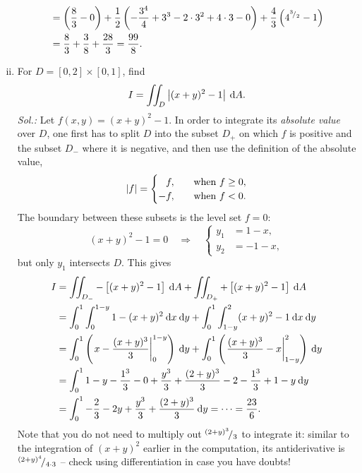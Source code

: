 \begin{example}
\begin{enumerate}[(i)]
\begin{equation*}
\begin{split}
& = \left(\frac83-0\right) + \frac12\left( -\frac{3^4}{4}+3^3-2 \cdot 3^2+4 \cdot 3- 0\right) 
    +\frac43\left( 4^{{}^{3}\!/_{2}}-1 \right) \\
& = \frac{8}{3} + \frac{3}{8} + \frac{28}{3} = \frac{99}{8}.
\end{split}
\end{equation*}
	\item
For $D = [0,2]\times[0,1]$, find
\[I = \iint_D \left| (x+y)^2-1 \right| \: \mathrm{d} A. \]
{\it Sol.:} Let $f(x,y)=(x+y)^2-1$. In order to integrate its \emph{absolute value} over $D$, one first has to split $D$ into the subset $D_+$ on which $f$ is positive and the subset $D_-$ where it is negative, and then use the definition of the absolute value,
\[ \left| f \right| = \begin{cases}
\phantom{-}f,& \quad \text{when~} f\geq0, \\
-f,& \quad \text{when~} f<0. 
\end{cases} \]
The boundary between these subsets is the level set $f=0$:
\[ (x+y)^2-1=0 \quad \Longrightarrow \quad \begin{cases}
y_1&=1-x, \\
y_2&=-1-x,
\end{cases} \]
but only $y_1$ intersects $D$. This gives
\begin{equation*}
\begin{split}
I &= \iint_{D_-}-\left[(x+y)^2-1\right]\:\mathrm{d} A + \iint_{D_+}+\left[(x+y)^2-1\right]\:\mathrm{d} A \\
&= \int_{0}^{1} \int_{0}^{1-y} 1-(x+y)^2 \: \mathrm{d} x \: \mathrm{d} y+\int_{0}^{1} \int_{1-y}^{2} (x+y)^2-1 \: \mathrm{d} x \: \mathrm{d} y \\
&= \int_{0}^{1} \left(\left.x-\frac{(x+y)^3}{3}\right|_0^{1-y}\right) \: \mathrm{d} y
	+\int_{0}^{1} \left(\left.\frac{(x+y)^3}{3}-x\right|_{1-y}^2\right) \: \mathrm{d} y \\
&= \int_{0}^{1} 1-y-\frac{1^3}{3}-0+\frac{y^3}{3}+\frac{(2+y)^3}{3}-2-\frac{1^3}{3}+1-y \: \mathrm{d} y \\
&= \int_{0}^{1} -\frac{2}{3}-2y+\frac{y^3}{3}+\frac{(2+y)^3}{3} \: \mathrm{d} y=\dots=\frac{23}{6}.
\end{split}
\end{equation*}
Note that you do not need to multiply out ${}^{(2+y)^3}\!/_{3}$ to integrate it: similar to the integration of $(x+y)^2$ earlier in the computation, its antiderivative is ${}^{(2+y)^4}\!/_{4 \cdot 3}$ -- check using differentiation in case you have doubts!
\end{enumerate}
\end{example}

